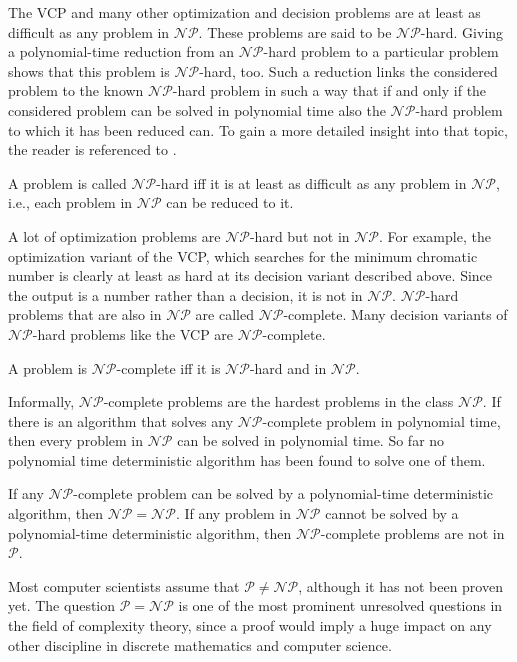 The VCP and many other optimization and decision problems are at least as difficult as any problem in $\mathcal{NP}$. These problems are said to be $\mathcal{NP}$-hard. Giving a polynomial-time reduction from an $\mathcal{NP}$-hard problem to a particular problem shows that this problem is $\mathcal{NP}$-hard, too. Such a reduction links the considered problem to the known $\mathcal{NP}$-hard problem in such a way that if and only if the considered problem can be solved in polynomial time also the $\mathcal{NP}$-hard problem to which it has been reduced can.\cite{neumann-10} To gain a more detailed insight into that topic, the reader is referenced to \cite{wegener-05}.
\begin{definition}
A problem is called $\mathcal{NP}$-hard iff it is at least as difficult as any problem in $\mathcal{NP}$, i.e., each problem in $\mathcal{NP}$ can be reduced to it.
\end{definition}
A lot of optimization problems are $\mathcal{NP}$-hard but not in $\mathcal{NP}$. For example, the optimization variant of the VCP, which searches for the minimum chromatic number is clearly at least as hard at its decision variant described above. Since the output is a number rather than a decision, it is not in $\mathcal{NP}$. $\mathcal{NP}$-hard problems that are also in $\mathcal{NP}$ are called $\mathcal{NP}$-complete. Many decision variants of $\mathcal{NP}$-hard problems like the VCP are $\mathcal{NP}$-complete.
\begin{definition}
A problem is $\mathcal{NP}$-complete iff it is $\mathcal{NP}$-hard and in $\mathcal{NP}$.
\end{definition}
Informally, $\mathcal{NP}$-complete problems are the hardest problems in the class $\mathcal{NP}$. If there is an algorithm that solves any $\mathcal{NP}$-complete problem in polynomial time, then every problem in $\mathcal{NP}$ can be solved in polynomial time. So far no polynomial time deterministic algorithm has been found to solve one of them. 
\begin{theorem}
If any $\mathcal{NP}$-complete problem can be solved by a polynomial-time deterministic algorithm, then $\mathcal{NP} = \mathcal{NP}$. If any problem in $\mathcal{NP}$ cannot be solved by a polynomial-time deterministic algorithm, then $\mathcal{NP}$-complete problems are not in $\mathcal{P}$.
\end{theorem}
Most computer scientists assume that $\mathcal{P} \neq \mathcal{NP}$, although it has not been proven yet. The question $\mathcal{P} = \mathcal{NP}$ is one of the most prominent unresolved questions in the field of complexity theory, since a proof would imply a huge impact on any other discipline in discrete mathematics and computer science.\\
